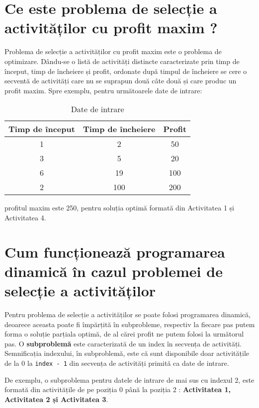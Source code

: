 \section{Ce este problema de selecție a activităților cu profit maxim ?}
Problema de selecție a activităților cu profit maxim este o problema de optimizare. Dându-se o listă de activități distincte caracterizate prin timp de început, timp de încheiere și profit, ordonate după timpul de încheiere se cere o secventă de activități care nu se suprapun două câte două și care produc un profit maxim. 
Spre exemplu, pentru următoarele date de intrare:
\begin{table}[h]
\centering
\begin{tabular}{|c|c|c|}
\hline
Timp de început & Timp de încheiere  & Profit \\
\hline
1  &  2   & 50   \\
3   & 5   & 20   \\
6   & 19   & 100   \\
2 & 100 & 200 \\
\hline
\end{tabular}
\caption{Date de intrare}
\label{tab:simple_table}
\end{table}
profitul maxim este 250, pentru soluția optimă formată din Activitatea 1 și Activitatea 4.

\section{Cum funcționează programarea dinamică în cazul problemei de selecție a activităților}
Pentru problema de selecție a activităților se poate folosi programarea dinamică, deoarece aceasta poate fi împărțită în subprobleme, respectiv la fiecare pas putem forma o soluție parțiala optimă, de al cărei profit ne putem folosi la următorul pas. O \textbf{subproblemă} este caracterizată de un index în secvența de activități. Semnificația indexului, în subproblemă, este că sunt disponibile doar activitățile de la 0 la \texttt{index - 1} din secvența de activități primită ca date de intrare.

De exemplu, o subproblema pentru datele de intrare de mai sus cu indexul 2, este formată din activitățile de pe poziția 0 până la poziția 2 : \textbf{Activitatea 1, Activitatea 2 și Activitatea 3}. 

